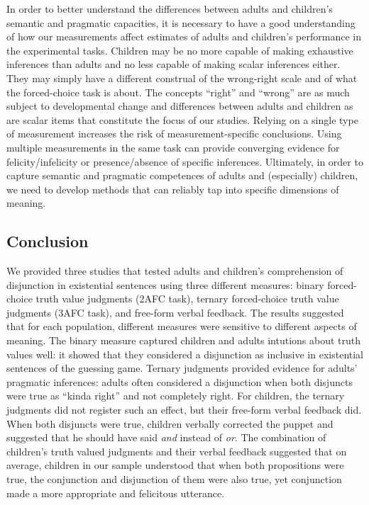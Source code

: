 \documentclass[,man,floatsintext]{apa6}
\begin{document}
In order to better understand the differences between adults and children's semantic and pragmatic capacities, it is necessary to have a good understanding of how our measurements affect estimates of adults and children's performance in the experimental tasks. Children may be no more capable of making exhaustive inferences than adults and no less capable of making scalar inferences either. They may simply have a different construal of the wrong-right scale and of what the forced-choice task is about. The concepts \enquote{right} and \enquote{wrong} are as much subject to developmental change and differences between adults and children as are scalar items that constitute the focus of our studies. Relying on a single type of measurement increases the risk of measurement-specific conclusions. Using multiple measurements in the same task can provide converging evidence for felicity/infelicity or presence/absence of specific inferences. Ultimately, in order to capture semantic and pragmatic competences of adults and (especially) children, we need to develop methods that can reliably tap into specific dimensions of meaning.

\hypertarget{conclusion}{%
\subsection{Conclusion}\label{conclusion}}

We provided three studies that tested adults and children's comprehension of disjunction in existential sentences using three different measures: binary forced-choice truth value judgments (2AFC task), ternary forced-choice truth value judgments (3AFC task), and free-form verbal feedback. The results suggested that for each population, different measures were sensitive to different aspects of meaning. The binary measure captured children and adults intutions about truth values well: it showed that they considered a disjunction as inclusive in existential sentences of the guessing game. Ternary judgments provided evidence for adults' pragmatic inferences: adults often considered a disjunction when both disjuncts were true as \enquote{kinda right} and not completely right. For children, the ternary judgments did not register such an effect, but their free-form verbal feedback did. When both disjuncts were true, children verbally corrected the puppet and suggested that he should have said \emph{and} instead of \emph{or}. The combination of children's truth valued judgments and their verbal feedback suggested that on average, children in our sample understood that when both propositions were true, the conjunction and disjunction of them were also true, yet conjunction made a more appropriate and felicitous utterance.
\end{document}
